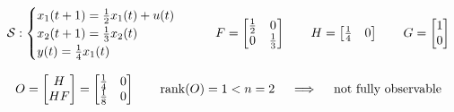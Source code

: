 \begin{exa}[SISO system of order $n=2$]
    \begin{align*}
    \mathcal{S}: 
        \begin{cases}
            x_1(t+1) = \frac{1}{2} x_1(t) + u(t) \\
            x_2(t+1) = \frac{1}{3}x_2(t) \\
            y(t) = \frac{1}{4}x_1(t)
        \end{cases}
        \qquad
        F = \begin{bmatrix}
            \frac{1}{2} & 0 \\
            0 & \frac{1}{3}
        \end{bmatrix}
        \qquad
        H = \begin{bmatrix}
            \frac{1}{4} & 0
        \end{bmatrix}
        \qquad
        G = \begin{bmatrix}
            1 \\
            0
        \end{bmatrix}
    \end{align*}

    \[
        O = \begin{bmatrix}
            H \\
            HF
        \end{bmatrix} = \begin{bmatrix}
            \frac{1}{4} & 0 \\
            \frac{1}{8} & 0
        \end{bmatrix}
        \qquad
        \operatorname*{rank} (O) = 1 < n = 2
        \quad\implies\quad \text{not fully observable}
    \]


\end{exa}
